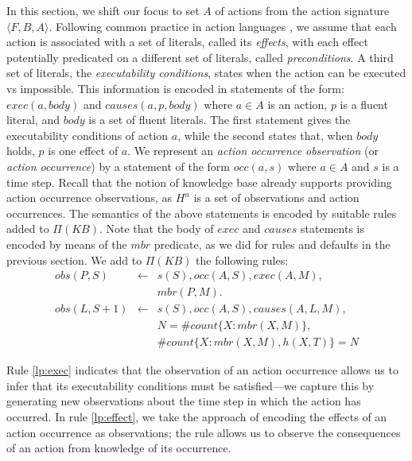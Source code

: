 \documentclass{article}
\begin{document}
In this section, we shift our focus to set $A$ of actions from the action signature $\langle F, B, A \rangle$. Following common practice in action languages \cite{GelfondL98}, we assume that each action is  associated with a set of literals, called its \emph{effects}, with each effect potentially predicated on a different set of literals, called \emph{preconditions}. A third set of literals, the \emph{executability conditions}, states when the action can be executed vs impossible. This information is encoded in statements of the form: 
$exec(a,body)$ and $causes(a,p,body)$ 
%
where $a \in A$ is an action, $p$ is a fluent literal, and $body$ is a set of fluent literals. 
 The first statement gives the executability conditions of action $a$, while the second states that, when $body$ holds, $p$ is one effect of $a$. We represent an \emph{action occurrence observation} (or {\em action occurrence}) by a statement of the form
 $occ(a,s)$
where $a\in A$ and $s$ is a time step. Recall that the notion of knowledge base already supports providing action occurrence observations, as  $H^{n}$ is a set of observations and action occurrences. The semantics of the above statements is encoded by suitable rules added to $\Pi(KB)$. 
 Note that the body of $exec$ and $causes$ statements is encoded by means of the $mbr$ predicate, as we did for rules and defaults in the previous section. 
We add to $\Pi(KB)$ the following rules:
%
\begin{eqnarray}
obs(P, S)  & \leftarrow & s(S), occ(A, S), exec(A, M), \label{lp:exec} \\
& & mbr(P, M).  \nonumber    \\ 
obs(L, S+1) & \leftarrow & s(S),     occ(A, S), causes(A, L, M),\\
& &  N  = \# count \{X : mbr(X, M)\},  \label{lp:effect} \nonumber\\
& & \# count \{X : mbr(X, M),  h(X, T) \} = N  \nonumber
\end{eqnarray} 

Rule \eqref{lp:exec} indicates that the observation of an action occurrence allows us to infer that its executability conditions must be satisfied---we capture this by generating new observations about the time step in which the action has occurred.
In rule \eqref{lp:effect}, we take the approach of encoding the effects of an action occurrence as observations; the rule allows us to observe the consequences of an action from knowledge of its occurrence.
\end{document}
